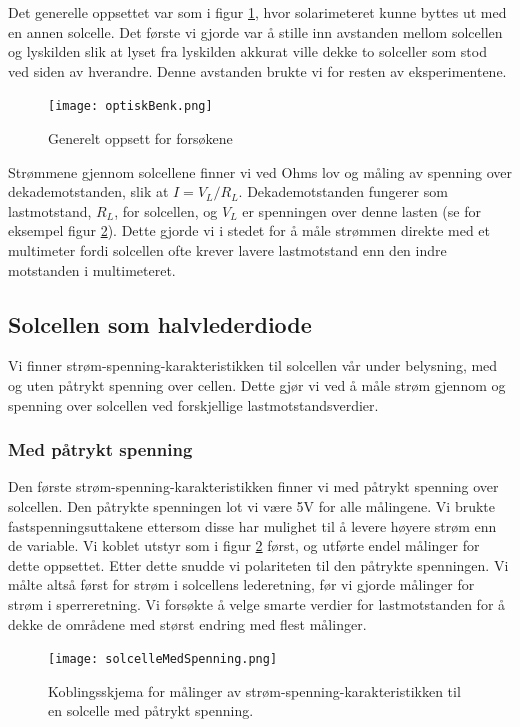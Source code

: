 \documentclass[a4paper,11pt, twocolumn]{article}
\begin{document}
Det generelle oppsettet var som i figur \ref{fig:oppsett}, hvor solarimeteret kunne byttes ut med en annen solcelle. Det første vi gjorde var å stille inn avstanden mellom solcellen og lyskilden slik at lyset fra lyskilden akkurat ville dekke to solceller som stod ved siden av hverandre. Denne avstanden brukte vi for resten av eksperimentene.
\begin{figure}[ht!]
	\texttt{[image: optiskBenk.png]}
	\caption{Generelt oppsett for forsøkene}
	\label{fig:oppsett}
\end{figure}
Strømmene gjennom solcellene finner vi ved Ohms lov og måling av spenning over dekademotstanden, slik at $I = V_L/R_L$. Dekademotstanden fungerer som lastmotstand, $R_L$, for solcellen, og $V_L$ er spenningen over denne lasten (se for eksempel figur \ref{fig:solcelleMedSpenning}). Dette gjorde vi i stedet for å måle strømmen direkte med et multimeter fordi solcellen ofte krever lavere lastmotstand enn den indre motstanden i multimeteret.
\subsection{Solcellen som halvlederdiode}
Vi finner strøm-spenning-karakteristikken til solcellen vår under belysning, med og uten påtrykt spenning over cellen. Dette gjør vi ved å måle strøm gjennom og spenning over solcellen ved forskjellige lastmotstandsverdier. 
\subsubsection{Med påtrykt spenning}
Den første strøm-spenning-karakteristikken finner vi med påtrykt spenning over solcellen. Den påtrykte spenningen lot vi være 5V for alle målingene. Vi brukte fastspenningsuttakene ettersom disse har mulighet til å levere høyere strøm enn de variable. Vi koblet utstyr som i figur \ref{fig:solcelleMedSpenning} først, og utførte endel målinger for dette oppsettet. Etter dette snudde vi polariteten til den påtrykte spenningen. Vi målte altså først for strøm i solcellens lederetning, før vi gjorde målinger for strøm i sperreretning. Vi forsøkte å velge smarte verdier for lastmotstanden for å dekke de områdene med størst endring med flest målinger.

\begin{figure}[!ht]
	\texttt{[image: solcelleMedSpenning.png]}
	\caption{Koblingsskjema for målinger av strøm-spenning-karakteristikken til en solcelle med påtrykt spenning.}
	\label{fig:solcelleMedSpenning}
\end{figure}
\end{document}
